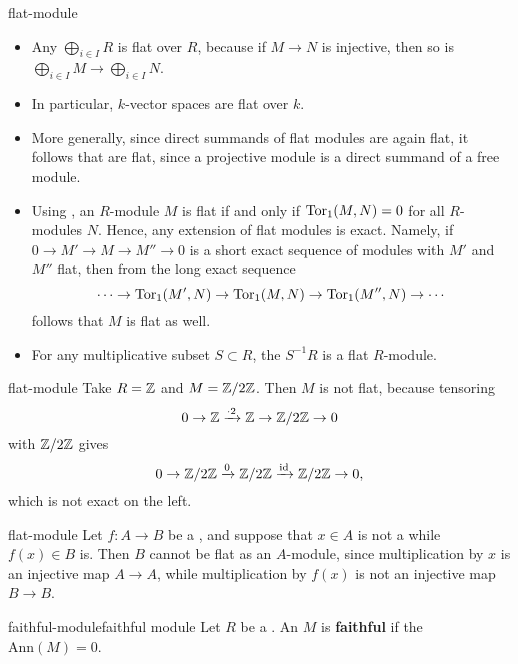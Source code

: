 \begin{example}{flat-module}
    \begin{itemize}
        \item Any  $\bigoplus_{i \in I} R$ is flat over $R$, because if $M \to N$ is injective, then so is $\bigoplus_{i \in I} M \to \bigoplus_{i \in I} N$.
        \item In particular, $k$-vector spaces are flat over $k$.
        \item More generally, since direct summands of flat modules are again flat, it follows that  are flat, since a projective module is a direct summand of a free module.
        \item Using , an $R$-module $M$ is flat if and only if $\textup{Tor}_1(M, N) = 0$ for all $R$-modules $N$. Hence, any extension of flat modules is exact. Namely, if $0 \to M' \to M \to M'' \to 0$ is a short exact sequence of modules with $M'$ and $M''$ flat, then from the long exact sequence
        \[ \cdots \to \textup{Tor}_1(M', N) \to \textup{Tor}_1(M, N) \to \textup{Tor}_1(M'', N) \to \cdots \]
        follows that $M$ is flat as well.
        \item For any multiplicative subset $S \subset R$, the  $S^{-1} R$ is a flat $R$-module.
    \end{itemize}
\end{example}

\begin{example}{flat-module}
    Take $R = \mathbb{Z}$ and $M = \mathbb{Z}/2\mathbb{Z}$. Then $M$ is not flat, because tensoring
    \[ 0 \rightarrow \mathbb{Z} \xrightarrow{\cdot 2} \mathbb{Z} \rightarrow \mathbb{Z}/2\mathbb{Z} \to 0 \]
    with $\mathbb{Z}/2\mathbb{Z}$ gives
    \[ 0 \rightarrow \mathbb{Z}/2\mathbb{Z} \xrightarrow{0} \mathbb{Z}/2\mathbb{Z} \xrightarrow{\text{id}} \mathbb{Z}/2\mathbb{Z} \to 0 , \]
    which is not exact on the left.
\end{example}

\begin{example}{flat-module}
    Let $f : A \to B$ be a , and suppose that $x \in A$ is not a  while $f(x) \in B$ is. Then $B$ cannot be flat as an $A$-module, since multiplication by $x$ is an injective map $A \to A$, while multiplication by $f(x)$ is not an injective map $B \to B$.
\end{example}

\begin{topic}{faithful-module}{faithful module}
     Let $R$ be a . An  $M$ is \textbf{faithful} if the  $\text{Ann}(M) = 0$.
\end{topic}

